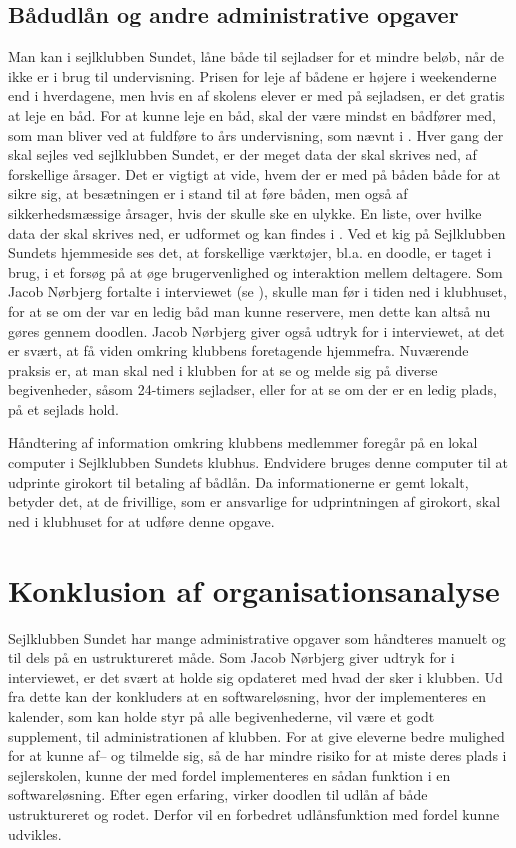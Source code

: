 \subsection{Bådudlån og andre administrative opgaver}\label{subsec:bådudlån}

Man kan i sejlklubben Sundet, låne både til sejladser for et mindre beløb, når de ikke er i brug til
undervisning. Prisen for leje af bådene er højere i weekenderne end i hverdagene, men hvis en af skolens
elever er med på sejladsen, er det gratis at leje en båd. For at kunne leje en båd, skal der være mindst en
bådfører med, som man bliver ved at fuldføre to års undervisning, som nævnt i .
Hver gang der skal sejles ved sejlklubben Sundet, er der meget data der skal skrives ned, af
forskellige årsager. Det er vigtigt at vide, hvem der er med på båden både for at sikre sig, at besætningen er
i stand til at føre båden, men også af sikkerhedsmæssige årsager, hvis der skulle ske en ulykke. En liste,
over hvilke data der skal skrives ned, er udformet og kan findes i . Ved et kig på
Sejlklubben Sundets hjemmeside \citep{SundetUdlaan} ses det, at forskellige værktøjer, bl.a. en doodle, er
taget i brug, i et forsøg på at øge brugervenlighed og interaktion mellem deltagere. Som Jacob Nørbjerg fortalte i
interviewet (se ), skulle man før i tiden ned i klubhuset, for at se om der var en
ledig båd man kunne reservere, men dette kan altså nu gøres gennem doodlen. Jacob Nørbjerg  giver også udtryk for i
interviewet, at det er svært, at få viden omkring klubbens foretagende hjemmefra. Nuværende praksis er, at man
skal ned i klubben for at se og melde sig på diverse begivenheder, såsom 24-timers sejladser, eller for at se
om der er en ledig plads, på et sejlads hold.

Håndtering af information omkring klubbens medlemmer foregår på en lokal computer i Sejlklubben Sundets
klubhus. Endvidere bruges denne computer til at udprinte girokort til betaling af bådlån. Da informationerne
er gemt lokalt, betyder det, at de frivillige, som er ansvarlige for udprintningen af girokort, skal ned i
klubhuset for at udføre denne opgave.


\section{Konklusion af organisationsanalyse}\label{sec:organisation-konklusion}

Sejlklubben Sundet har mange administrative opgaver som håndteres manuelt og til dels på en ustruktureret
måde. Som Jacob Nørbjerg giver udtryk for i interviewet, er det svært at holde sig opdateret med hvad der sker i
klubben. Ud fra dette kan der konkluders at en softwareløsning, hvor der implementeres en kalender, som kan
holde styr på alle begivenhederne, vil være et godt supplement, til administrationen af klubben. For at give
eleverne bedre mulighed for at kunne af-- og tilmelde sig, så de har mindre risiko for at miste deres plads i
sejlerskolen, kunne der med fordel implementeres en sådan funktion i en softwareløsning. Efter egen erfaring,
virker doodlen til udlån af både ustruktureret og rodet. Derfor vil en forbedret udlånsfunktion med fordel
kunne udvikles.

